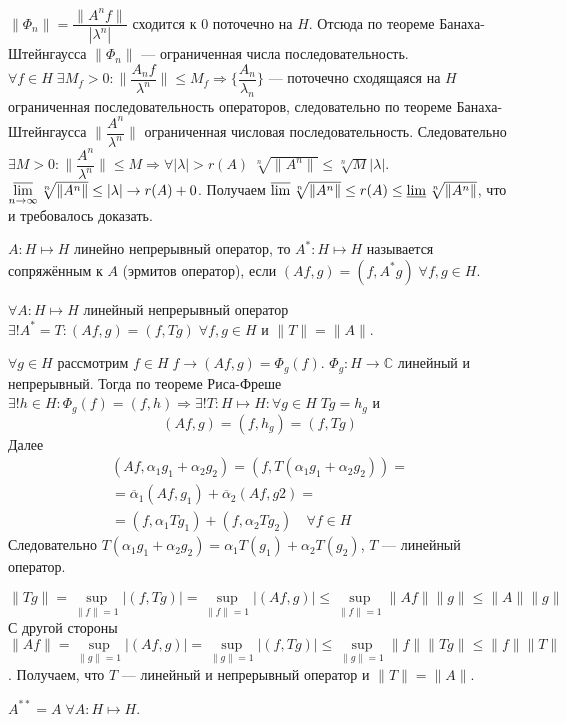 \documentclass[14pt]{extarticle}
\begin{document}
\begin{Proof}
    $\|\Phi_n\| = \dfrac {\|A^n f\|}{|\lambda^n|}$ сходится к 0 поточечно на $H$.
    Отсюда по теореме Банаха-Штейнгаусса $\|\Phi_n\|$ --- ограниченная числа последовательность. $\forall f \in H\;\exists M_f > 0\colon \|\dfrac{A_n f}{\lambda^n}\|
    \le M_f \Rightarrow \{\dfrac{A_n}{\lambda_n}\}$ --- поточечно сходящаяся на $H$ ограниченная последовательность операторов, следовательно
    по теореме Банаха-Штейнгаусса $\|\dfrac{A^n}{\lambda^n}\|$ ограниченная числовая последовательность.
    Следовательно $\exists M>0\colon \|\dfrac{A^n}{\lambda^n}\| \le M \Rightarrow \forall |\lambda| > r(A)\;\sqrt[n]{\|A^n\|} \le \sqrt[n]{M}|\lambda|$.
    $\varlimsup\limits_{n \to \infty} \sqrt[n]{\|A^n\|} \le |\lambda| \to r(A) + 0$.
    Получаем $\varlimsup\sqrt[n]{\|A^n\|} \le r(A) \le \varliminf\sqrt[n]{\|A^n\|}$, что и требовалось доказать.
\end{Proof}

\begin{Opr}
    $A : H \mapsto H$ линейно непрерывный оператор, то $A^* : H \mapsto H$ называется сопряжённым к $A$ (эрмитов оператор),
    если $(Af, g) = (f, A^* g)\;\forall f, g \in H$.
\end{Opr}

\begin{Utv}
    $\forall A : H \mapsto H$ линейный непрерывный оператор $\exists! A^* = T\colon (Af, g) = (f, Tg)\;\forall f, g \in H$ и $\|T\| = \|A\|$.
\end{Utv}
\begin{Proof}
    $\forall g \in H$ рассмотрим $f \in H\;f \to (Af, g) = \Phi_g(f)$.
    $\Phi_g : H \to \mathbb C$ линейный и непрерывный.
    Тогда по теореме Риса-Фреше $\exists! h \in H\colon \Phi_g(f) = (f, h) \Rightarrow \exists! T : H \mapsto H\colon \forall g \in H\;Tg = h_g$ и
    $$
    (Af, g) = (f, h_g) = (f, Tg)
    $$
    Далее 
    \begin{multline*}
    (Af, \alpha_1 g_1 + \alpha_2 g_2) = (f, T(\alpha_1 g_1 + \alpha_2 g_2)) =\\ 
    = \overline{\alpha}_1 (Af, g_1) + \overline{\alpha}_2 (Af, g2) =\\
    = (f, \alpha_1 Tg_1) + (f, \alpha_2 Tg_2)\quad \forall f \in H
    \end{multline*}
    Следовательно $T(\alpha_1 g_1 + \alpha_2 g_2) = \alpha_1 T(g_1) + \alpha_2 T(g_2)$, $T$ --- линейный оператор.
    
 $$
 \|Tg\| = \sup\limits_{\|f\| = 1}|(f, Tg)| = \sup\limits_{\|f\| = 1}|(Af, g)| \le \sup\limits_{\|f\| = 1}\|Af\|\|g\| \le \|A\|\|g\|
 $$
    С другой стороны 
    $$
    \|Af\| = \sup\limits_{\|g\| = 1}|(Af, g)| = \sup\limits_{\|g\| = 1}|(f, Tg)| \le \sup\limits_{\|g\| = 1} \|f\| \|Tg\| \le \|f\| \|T\|
    $$.
    Получаем, что $T$ --- линейный и непрерывный оператор и $\|T\| = \|A\|$.
\end{Proof}
\begin{Upr}
    $A^{**} = A\;\forall A : H \mapsto H$.
\end{Upr}
\end{document}
